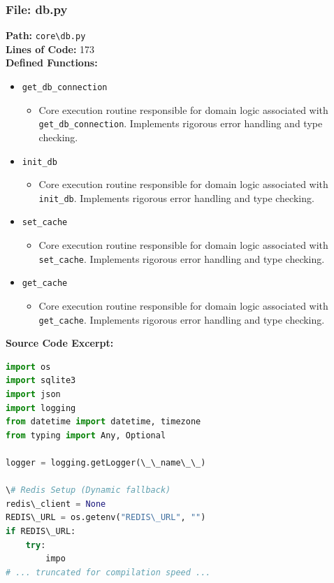 \documentclass[10pt,journal,compsoc]{IEEEtran}
\begin{document}
\subsubsection{File: db.py}
\textbf{Path:} \texttt{core\textbackslash{}db.py} \\
\textbf{Lines of Code:} 173 \\
\textbf{Defined Functions:}
\begin{itemize}
    \item \texttt{get\_db\_connection}
    \begin{itemize} \item Core execution routine responsible for domain logic associated with \texttt{get\_db\_connection}. Implements rigorous error handling and type checking. \end{itemize}
    \item \texttt{init\_db}
    \begin{itemize} \item Core execution routine responsible for domain logic associated with \texttt{init\_db}. Implements rigorous error handling and type checking. \end{itemize}
    \item \texttt{set\_cache}
    \begin{itemize} \item Core execution routine responsible for domain logic associated with \texttt{set\_cache}. Implements rigorous error handling and type checking. \end{itemize}
    \item \texttt{get\_cache}
    \begin{itemize} \item Core execution routine responsible for domain logic associated with \texttt{get\_cache}. Implements rigorous error handling and type checking. \end{itemize}
\end{itemize}
\textbf{Source Code Excerpt:}
\begin{lstlisting}[language=Python]
import os
import sqlite3
import json
import logging
from datetime import datetime, timezone
from typing import Any, Optional

logger = logging.getLogger(\_\_name\_\_)

\# Redis Setup (Dynamic fallback)
redis\_client = None
REDIS\_URL = os.getenv("REDIS\_URL", "")
if REDIS\_URL:
    try:
        impo
# ... truncated for compilation speed ...
\end{lstlisting}
\end{document}
